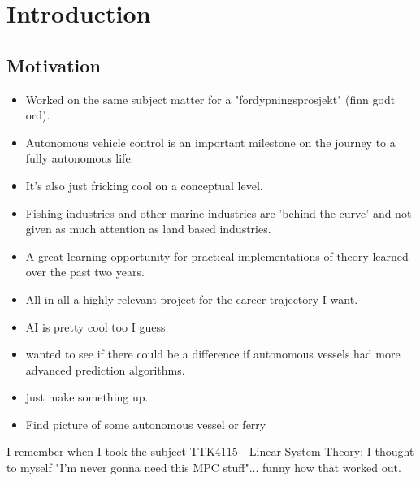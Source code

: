 \section{Introduction}
\subsection{Motivation}
\begin{itemize}
    \item Worked on the same subject matter for a "fordypningsprosjekt" (finn godt ord).
    \item Autonomous vehicle control is an important milestone on the journey to a fully autonomous life.
    \item It's also just fricking cool on a conceptual level.
    \item Fishing industries and other marine industries are 'behind the curve' and not given as much attention as land based industries.
    \item A great learning opportunity for practical implementations of theory learned over the past two years.
    \item All in all a highly relevant project for the career trajectory I want.
    \item AI is pretty cool too I guess
    \item wanted to see if there could be a difference if autonomous vessels had more advanced prediction algorithms.
    \item just make something up.
    \item Find picture of some autonomous vessel or ferry
\end{itemize}

I remember when I took the subject TTK4115 - Linear System Theory; I thought to myself "I'm never gonna need this MPC stuff"... 
funny how that worked out.

